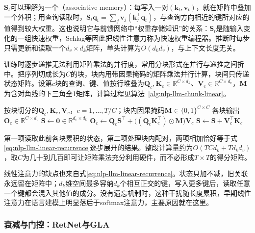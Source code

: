 $\bm S_t$可以理解为一个（associative memory）：每写入一对$(\bm k_t,\bm v_t)$，就在矩阵中叠加一个外积；用查询读取时，$\bm S_t\bm q_t=\sum_j\bm v_j(\bm k_j^{\top}\bm q_t)$，与查询方向相近的键所对应的值得到较大权重。这也说明它与前馈网络中“权重存储知识”的关系：$\bm S_t$是随输入变化的一组快速权重，Schlag等因此把线性注意力称为快速权重编程器。推断时每步只需更新和读取一个$d_v\times d_k$矩阵，单头计算为$O(d_kd_v)$，与上下文长度无关。

训练时逐步递推无法利用矩阵乘法的并行度，常用分块形式在并行与递推之间折中。把序列切成长为$C$的块，块内用带因果掩码的矩阵乘法并行计算，块间只传递状态矩阵。设第$c$块的查询、键、值按行堆叠为$\bm Q_c,\bm K_c\in\mathbb R^{C\times d_k}$、$\bm V_c\in\mathbb R^{C\times d_v}$，$\bm M$为含对角线的下三角全1矩阵，计算过程见算法~\ref{alg:nlp-llm-chunk-linear}。

\begin{algorithm}[线性注意力的分块并行计算]
  \label{alg:nlp-llm-chunk-linear}
  \begin{algorithmic}[1]
    \Require 按块切分的$\bm Q_c,\bm K_c,\bm V_c$，$c=1,\ldots,T/C$；块内因果掩码$\bm M\in\{0,1\}^{C\times C}$
    \Ensure 各块输出$\bm O_c\in\mathbb R^{C\times d_v}$
    \State $\bm S\gets\bm 0\in\mathbb R^{d_v\times d_k}$
      \State $\bm O_c\gets\bm Q_c\bm S^{\top}+\bigl((\bm Q_c\bm K_c^{\top})\odot\bm M\bigr)\bm V_c$ 
      \State $\bm S\gets\bm S+\bm V_c^{\top}\bm K_c$ 
    \EndFor
  \end{algorithmic}
\end{algorithm}

第一项读取此前各块累积的状态，第二项处理块内配对，两项相加恰好等于式\eqref{eq:nlp-llm-linear-recurrence}逐步展开的结果。整段计算量约为$O(TCd_k+Td_kd_v)$，取$C$为几十到几百即可让矩阵乘法充分利用硬件，而不必形成$T\times T$的得分矩阵。

线性注意力的缺点也来自式\eqref{eq:nlp-llm-linear-recurrence}。状态只加不减，旧关联永远留在矩阵中；$d_k$维空间最多容纳$d_k$个相互正交的键，写入更多键后，读取任意一个键都会混入其他值的成分。没有遗忘机制时，这种干扰随长度累积，早期线性注意力在语言建模上明显落后于softmax注意力，主要原因就在这里。

\subsubsection{衰减与门控：RetNet与GLA}
\label{sec:nlp-llm-decay-gating}

